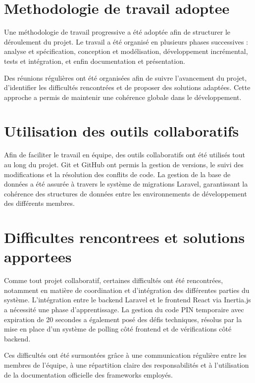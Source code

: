 \documentclass[12pt, a4paper, openright]{report}
\begin{document}
\section{Methodologie de travail adoptee}

Une méthodologie de travail progressive a été adoptée afin de structurer le déroulement du projet. Le travail a été organisé en plusieurs phases successives : analyse et spécification, conception et modélisation, développement incrémental, tests et intégration, et enfin documentation et présentation.

Des réunions régulières ont été organisées afin de suivre l'avancement du projet, d'identifier les difficultés rencontrées et de proposer des solutions adaptées. Cette approche a permis de maintenir une cohérence globale dans le développement.

\section{Utilisation des outils collaboratifs}

Afin de faciliter le travail en équipe, des outils collaboratifs ont été utilisés tout au long du projet. Git et GitHub ont permis la gestion de versions, le suivi des modifications et la résolution des conflits de code. La gestion de la base de données a été assurée à travers le système de migrations Laravel, garantissant la cohérence des structures de données entre les environnements de développement des différents membres.

\section{Difficultes rencontrees et solutions apportees}

Comme tout projet collaboratif, certaines difficultés ont été rencontrées, notamment en matière de coordination et d'intégration des différentes parties du système. L'intégration entre le backend Laravel et le frontend React via Inertia.js a nécessité une phase d'apprentissage. La gestion du code PIN temporaire avec expiration de 20 secondes a également posé des défis techniques, résolus par la mise en place d'un système de polling côté frontend et de vérifications côté backend.

Ces difficultés ont été surmontées grâce à une communication régulière entre les membres de l'équipe, à une répartition claire des responsabilités et à l'utilisation de la documentation officielle des frameworks employés.
\end{document}
